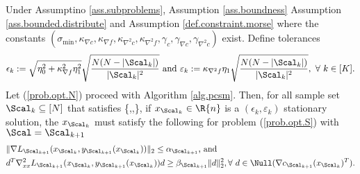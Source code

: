 %	

\begin{theorem}
Under Assumptino \ref{ass.subproblems}, Assumption \ref{ass.boundness}  Assumption \ref{ass.bounded.distribute} and Assumption \ref{def.constraint.morse} where the constants $(\sigma_{\min}, \kappa_{\nabla c},\kappa_{\nabla f},\kappa_{\nabla^2 c},\kappa_{\nabla^2 f},\gamma_c,\gamma_{\nabla c},\gamma_{\nabla^2 c} )$ exist.  Define tolerances 
\[
\epsilon_k:=\sqrt{\eta_0^2+\kappa_{\nabla f}^2\eta_1^2}\sqrt{\frac{N(N-|\Scal_k|)}{|\Scal_k|^2}}\text{ and }\varepsilon_k:= \kappa_{\nabla^2f}\eta_1\sqrt{\frac{N(N-|\Scal_k|)}{|\Scal_k|^2}},\ \forall\ k\in[K].
\]
Let (\ref{prob.opt.N}) proceed with Algorithm \ref{alg.pcsm}. Then, for all sample set $\Scal_k\subseteq[N]$ that satisfies
\bequation
\label{eq.theorem2.S}
\le
\min\left\{,,\right\},
\eequation
if $x_{\Scal_k}\in\R{n}$ is a $(\epsilon_k,\varepsilon_k)$ stationary solution, the $x_{\Scal_k}$ must satisfy the following for problem (\ref{prob.opt.S}) with $\Scal=\Scal_{k+1}$
\begin{align*}
	&\|\nabla L_{\Scal_{k+1}}(x_{\Scal_{k}},y_{\Scal_{k+1}}(x_{\Scal_k}))\|_2 \le\alpha_{\Scal_{k+1}}\text{, and }\\
	& d^T\nabla^2_{xx}L_{\Scal_{k+1}}(x_{\Scal_{k}},y_{\Scal_{k+1}}(x_{\Scal_k}))d\ge \beta_{\Scal_{k+1}}\|d\|_2^2,\forall \ d\in\Null(\nabla c_{\Scal_{k+1}}(x_{\Scal_k})^T).
\end{align*}
\end{theorem}

